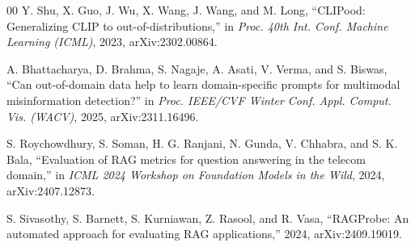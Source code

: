 \documentclass[conference,a4paper]{IEEEtran}
\begin{document}
\begin{thebibliography}{00}
 Y. Shu, X. Guo, J. Wu, X. Wang, J. Wang, and M. Long,
``CLIPood: Generalizing CLIP to out-of-distributions,'' in \emph{Proc. 40th
Int. Conf. Machine Learning (ICML)}, 2023, arXiv:2302.00864.

 A. Bhattacharya, D. Brahma, S. Nagaje, A. Asati, V. Verma, and
S. Biswas, ``Can out-of-domain data help to learn domain-specific prompts for
multimodal misinformation detection?'' in \emph{Proc. IEEE/CVF Winter Conf.
Appl. Comput. Vis. (WACV)}, 2025, arXiv:2311.16496.

 S. Roychowdhury, S. Soman, H. G. Ranjani, N. Gunda,
V. Chhabra, and S. K. Bala, ``Evaluation of RAG metrics for question answering
in the telecom domain,'' in \emph{ICML 2024 Workshop on Foundation Models in
the Wild}, 2024, arXiv:2407.12873.

 S. Sivasothy, S. Barnett, S. Kurniawan, Z. Rasool, and
R. Vasa, ``RAGProbe: An automated approach for evaluating RAG applications,''
2024, arXiv:2409.19019.

\end{thebibliography}

%
%
\end{document}
